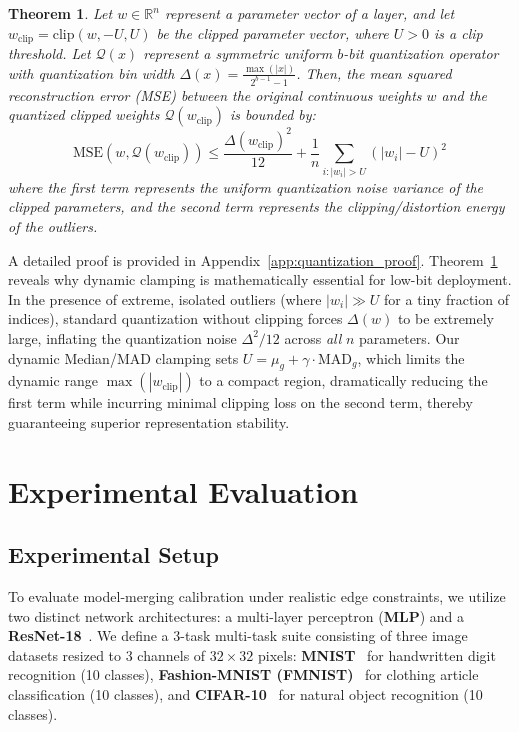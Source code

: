 \documentclass{article}
\theoremstyle{plain}
\newtheorem{theorem}{Theorem}[section]
\theoremstyle{definition}
\theoremstyle{remark}
\begin{document}
\begin{theorem} \label{thm:quantization_bound}
Let $w \in \mathbb{R}^n$ represent a parameter vector of a layer, and let $w_{\text{clip}} = \text{clip}(w, -U, U)$ be the clipped parameter vector, where $U > 0$ is a clip threshold. Let $\mathcal{Q}(x)$ represent a symmetric uniform $b$-bit quantization operator with quantization bin width $\Delta(x) = \frac{\max(|x|)}{2^{b-1}-1}$. Then, the mean squared reconstruction error (MSE) between the original continuous weights $w$ and the quantized clipped weights $\mathcal{Q}(w_{\text{clip}})$ is bounded by:
\begin{equation}
    \text{MSE}(w, \mathcal{Q}(w_{\text{clip}})) \leq \frac{\Delta(w_{\text{clip}})^2}{12} + \frac{1}{n} \sum_{i: |w_i| > U} (|w_i| - U)^2
\end{equation}
where the first term represents the uniform quantization noise variance of the clipped parameters, and the second term represents the clipping/distortion energy of the outliers.
\end{theorem}
A detailed proof is provided in Appendix~\ref{app:quantization_proof}. Theorem~\ref{thm:quantization_bound} reveals why dynamic clamping is mathematically essential for low-bit deployment. In the presence of extreme, isolated outliers (where $|w_i| \gg U$ for a tiny fraction of indices), standard quantization without clipping forces $\Delta(w)$ to be extremely large, inflating the quantization noise $\Delta^2/12$ across \textit{all} $n$ parameters. Our dynamic Median/MAD clamping sets $U = \mu_g + \gamma \cdot \text{MAD}_g$, which limits the dynamic range $\max(|w_{\text{clip}}|)$ to a compact region, dramatically reducing the first term while incurring minimal clipping loss on the second term, thereby guaranteeing superior representation stability.

\section{Experimental Evaluation}
\label{sec:experiments}

\subsection{Experimental Setup}
To evaluate model-merging calibration under realistic edge constraints, we utilize two distinct network architectures: a multi-layer perceptron (\textbf{MLP}) and a \textbf{ResNet-18}~\cite{he2016resnet}. We define a 3-task multi-task suite consisting of three image datasets resized to 3 channels of $32\times32$ pixels: \textbf{MNIST}~\cite{lecun98mnist} for handwritten digit recognition (10 classes), \textbf{Fashion-MNIST (FMNIST)}~\cite{xiao17fmnist} for clothing article classification (10 classes), and \textbf{CIFAR-10}~\cite{krizhevsky09cifar} for natural object recognition (10 classes).
\end{document}
